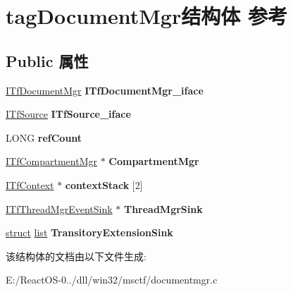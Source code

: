 \hypertarget{structtag_document_mgr}{}\section{tag\+Document\+Mgr结构体 参考}
\label{structtag_document_mgr}
\subsection*{Public 属性}
\begin{DoxyCompactItemize}
\item 
\mbox{\label{structtag_document_mgr_a7e61dd8ba3895b203343013f9811c7ae}} 
\hyperlink{interface_i_tf_document_mgr}{I\+Tf\+Document\+Mgr} {\bfseries I\+Tf\+Document\+Mgr\+\_\+iface}
\item 
\mbox{\label{structtag_document_mgr_a473433a0a30850f72135837fc16bb518}} 
\hyperlink{interface_i_tf_source}{I\+Tf\+Source} {\bfseries I\+Tf\+Source\+\_\+iface}
\item 
\mbox{\label{structtag_document_mgr_a299abf03aa4bc9ed97377627c6212d1a}} 
L\+O\+NG {\bfseries ref\+Count}
\item 
\mbox{\label{structtag_document_mgr_af9c2533fb3fbfec3dc9365ebbc0d36f7}} 
\hyperlink{interface_i_tf_compartment_mgr}{I\+Tf\+Compartment\+Mgr} $\ast$ {\bfseries Compartment\+Mgr}
\item 
\mbox{\label{structtag_document_mgr_a8fc7e6c12ad7111f9acd0e0628340031}} 
\hyperlink{interface_i_tf_context}{I\+Tf\+Context} $\ast$ {\bfseries context\+Stack} \mbox{[}2\mbox{]}
\item 
\mbox{\label{structtag_document_mgr_a363a4eb9675a97e3ab38c689fa6adcef}} 
\hyperlink{interface_i_tf_thread_mgr_event_sink}{I\+Tf\+Thread\+Mgr\+Event\+Sink} $\ast$ {\bfseries Thread\+Mgr\+Sink}
\item 
\mbox{\label{structtag_document_mgr_a9fde47e8cf4e1e11f00294d917ada397}} 
\hyperlink{interfacestruct}{struct} \hyperlink{classlist}{list} {\bfseries Transitory\+Extension\+Sink}
\end{DoxyCompactItemize}


该结构体的文档由以下文件生成\+:\begin{DoxyCompactItemize}
\item 
E\+:/\+React\+O\+S-\/0../dll/win32/msctf/documentmgr.\+c\end{DoxyCompactItemize}

